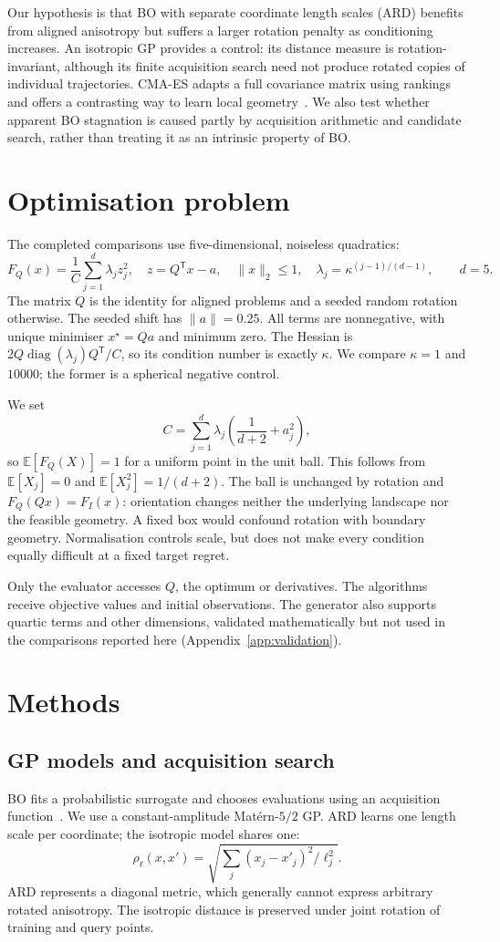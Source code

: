 \documentclass[12pt]{article}
\begin{document}
Our hypothesis is that BO with separate coordinate length scales (ARD) benefits
from aligned anisotropy but suffers a larger rotation penalty as conditioning
increases. An isotropic GP provides a control: its distance measure is
rotation-invariant, although its finite acquisition search need not produce
rotated copies of individual trajectories. CMA-ES adapts a full covariance
matrix using rankings and offers a contrasting way to learn local
geometry~\citep{hansen}. We also test whether apparent BO stagnation is caused
partly by acquisition arithmetic and candidate search, rather than treating
it as an intrinsic property of BO.

\section{Optimisation problem}
The completed comparisons use five-dimensional, noiseless quadratics:
\[
 F_Q(x)=\frac{1}{C}\sum_{j=1}^{d}\lambda_j z_j^2,
 \quad z=Q^{\mathsf T}x-a,\quad \|x\|_2\leq1,
 \quad \lambda_j=\kappa^{(j-1)/(d-1)},
 \qquad d=5.
\]
The matrix $Q$ is the identity for aligned problems and a seeded random
rotation otherwise. The seeded shift has $\|a\|=0.25$. All terms are
nonnegative, with unique minimiser $x^\star=Qa$ and minimum zero. The Hessian
is $2Q\operatorname{diag}(\lambda_j)Q^{\mathsf T}/C$, so its condition
number is exactly $\kappa$. We compare $\kappa=1$ and $10000$; the former
is a spherical negative control.

We set
\[
 C=\sum_{j=1}^{d}\lambda_j\left(\frac{1}{d+2}+a_j^2\right),
\]
so $\mathbb E[F_Q(X)]=1$ for a uniform point in the unit ball. This follows
from $\mathbb E[X_j]=0$ and $\mathbb E[X_j^2]=1/(d+2)$. The ball is
unchanged by rotation and $F_Q(Qx)=F_I(x)$: orientation changes neither the
underlying landscape nor the feasible geometry. A fixed box would confound
rotation with boundary geometry. Normalisation controls scale, but does not
make every condition equally difficult at a fixed target regret.

Only the evaluator accesses $Q$, the optimum or derivatives. The algorithms
receive objective values and initial observations. The generator also supports
quartic terms and other dimensions, validated mathematically but not used in
the comparisons reported here (Appendix~\ref{app:validation}).

\section{Methods}
\subsection{GP models and acquisition search}
BO fits a probabilistic surrogate and chooses evaluations using an acquisition
function~\citep{frazier}. We use a constant-amplitude Mat\'ern-$5/2$ GP.
ARD learns one length scale per coordinate; the isotropic model shares one:
\[
 \rho_{\ell}(x,x')=\sqrt{\sum_j (x_j-x'_j)^2/\ell_j^2}.
\]
ARD represents a diagonal metric, which generally cannot express arbitrary
rotated anisotropy. The isotropic distance is preserved under joint rotation
of training and query points.
\end{document}
